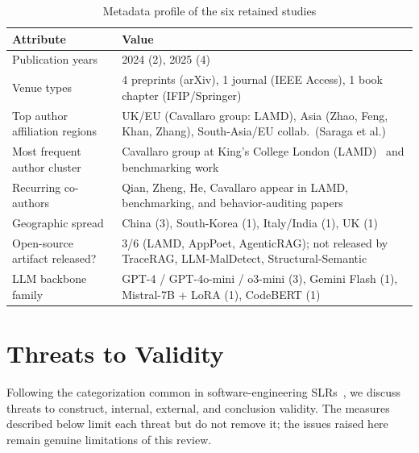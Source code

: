 \begin{table}[htbp]
\centering
\caption{Metadata profile of the six retained studies}
\label{tab:metadata}
\footnotesize
\begin{tabularx}{\columnwidth}{lX}
\toprule
Attribute & Value \\
\midrule
Publication years & 2024 (2), 2025 (4) \\
Venue types & 4 preprints (arXiv), 1 journal (IEEE Access), 1 book chapter (IFIP/Springer) \\
Top author affiliation regions & UK/EU (Cavallaro group: LAMD), Asia (Zhao, Feng, Khan, Zhang), South-Asia/EU collab.\ (Saraga et al.) \\
Most frequent author cluster & Cavallaro group at King's College London (LAMD)~\cite{Qian2025-ua} and benchmarking work~\cite{He2025-ma,Zheng2025-no} \\
Recurring co-authors & Qian, Zheng, He, Cavallaro appear in LAMD, benchmarking, and behavior-auditing papers \\
Geographic spread & China (3), South-Korea (1), Italy/India (1), UK (1) \\
Open-source artifact released? & 3/6 (LAMD, AppPoet, AgenticRAG); not released by TraceRAG, LLM-MalDetect, Structural-Semantic \\
LLM backbone family & GPT-4 / GPT-4o-mini / o3-mini (3), Gemini Flash (1), Mistral-7B + LoRA (1), CodeBERT (1) \\
\bottomrule
\end{tabularx}
\end{table}

\renewcommand{\arraystretch}{1.25}
\setlength{\tabcolsep}{6pt}






\section{Threats to Validity}\label{sec:threats}

Following the categorization common in software-engineering SLRs~\cite{kitchenham2007guidelines, wohlin2014guidelines}, we discuss threats to construct, internal, external, and conclusion validity. The measures described below limit each threat but do not remove it; the issues raised here remain genuine limitations of this review.

